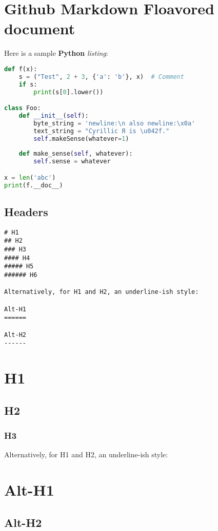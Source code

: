 \documentclass[a4paper, 11pt]{gfm}
\begin{document}
\section{Github Markdown Floavored document}

Here is a sample {\bf Python} {\it listing}:

\begin{lstlisting}[language=Python]
def f(x):
	s = ("Test", 2 + 3, {'a': 'b'}, x)  # Comment
	if s:
		print(s[0].lower())

class Foo:
	def __init__(self):
		byte_string = 'newline:\n also newline:\x0a'
		text_string = "Cyrillic Я is \u042f."
		self.makeSense(whatever=1)
	
	def make_sense(self, whatever):
		self.sense = whatever

x = len('abc')
print(f.__doc__)
\end{lstlisting}

\subsection{Headers}

\begin{lstlisting}
# H1
## H2
### H3
#### H4
##### H5
###### H6

Alternatively, for H1 and H2, an underline-ish style:

Alt-H1
======

Alt-H2
------
\end{lstlisting}

\section{H1}

\subsection{H2}

\subsubsection{H3}

Alternatively, for H1 and H2, an underline-ish style:

\section{Alt-H1}

\subsection{Alt-H2}
\end{document}
